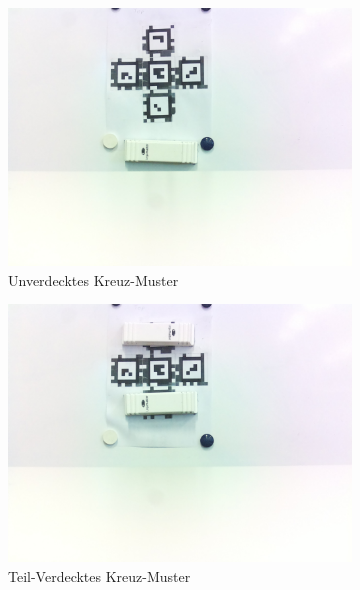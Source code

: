 \begin{figure}[H]
    \centering
    \begin{subfigure}[h]{0.45\textwidth}
        \includegraphics[width=\linewidth]{graphics/MittelpunktTestFoto.jpg}
        \caption{Unverdecktes Kreuz-Muster}
        \label{fig:MittelpunktTest}
    \end{subfigure}
    \begin{subfigure}[h]{0.45\textwidth}
        \includegraphics[width=\linewidth]{graphics/ocluded2Test.jpg}
        \caption{Teil-Verdecktes Kreuz-Muster}
        \label{fig:Mittelpunktocluded}
    \end{subfigure}
    \begin{subfigure}[h]{0.45\textwidth}

\end{subfigure}
\end{figure}
